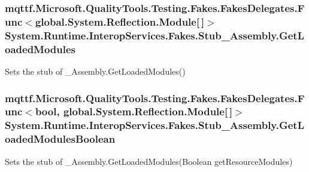 \hypertarget{class_system_1_1_runtime_1_1_interop_services_1_1_fakes_1_1_stub___assembly_a07bbde9faa0694fd32505bacb4f18b49}{
\subsubsection[{Get\-Loaded\-Modules}]{\setlength{\rightskip}{0pt plus 5cm}mqttf.\-Microsoft.\-Quality\-Tools.\-Testing.\-Fakes.\-Fakes\-Delegates.\-Func$<$global.\-System.\-Reflection.\-Module\mbox{[}$\,$\mbox{]}$>$ System.\-Runtime.\-Interop\-Services.\-Fakes.\-Stub\-\_\-\-Assembly.\-Get\-Loaded\-Modules}}\label{class_system_1_1_runtime_1_1_interop_services_1_1_fakes_1_1_stub___assembly_a07bbde9faa0694fd32505bacb4f18b49}


Sets the stub of \-\_\-\-Assembly.\-Get\-Loaded\-Modules()

\hypertarget{class_system_1_1_runtime_1_1_interop_services_1_1_fakes_1_1_stub___assembly_ab75303bbab5ef71b18e8605ff0331896}{
\subsubsection[{Get\-Loaded\-Modules\-Boolean}]{\setlength{\rightskip}{0pt plus 5cm}mqttf.\-Microsoft.\-Quality\-Tools.\-Testing.\-Fakes.\-Fakes\-Delegates.\-Func$<$bool, global.\-System.\-Reflection.\-Module\mbox{[}$\,$\mbox{]}$>$ System.\-Runtime.\-Interop\-Services.\-Fakes.\-Stub\-\_\-\-Assembly.\-Get\-Loaded\-Modules\-Boolean}}\label{class_system_1_1_runtime_1_1_interop_services_1_1_fakes_1_1_stub___assembly_ab75303bbab5ef71b18e8605ff0331896}


Sets the stub of \-\_\-\-Assembly.\-Get\-Loaded\-Modules(\-Boolean get\-Resource\-Modules)

